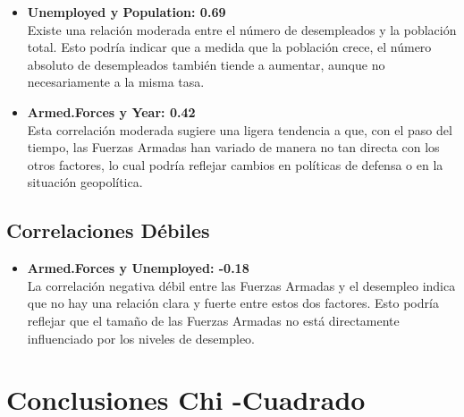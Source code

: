 \documentclass{article}
\begin{document}
    \begin{itemize}
        \item \textbf{Unemployed y Population: 0.69} \\
        Existe una relación moderada entre el número de desempleados y la población total. Esto podría indicar que a medida que la población crece, el número absoluto de desempleados también tiende a aumentar, aunque no necesariamente a la misma tasa.
        
        \item \textbf{Armed.Forces y Year: 0.42} \\
        Esta correlación moderada sugiere una ligera tendencia a que, con el paso del tiempo, las Fuerzas Armadas han variado de manera no tan directa con los otros factores, lo cual podría reflejar cambios en políticas de defensa o en la situación geopolítica.
    \end{itemize}
    
    \subsection{Correlaciones Débiles}
    
    \begin{itemize}
        \item \textbf{Armed.Forces y Unemployed: -0.18} \\
        La correlación negativa débil entre las Fuerzas Armadas y el desempleo indica que no hay una relación clara y fuerte entre estos dos factores. Esto podría reflejar que el tamaño de las Fuerzas Armadas no está directamente influenciado por los niveles de desempleo.
    \end{itemize}
\section{Conclusiones Chi -Cuadrado}
\end{document}
